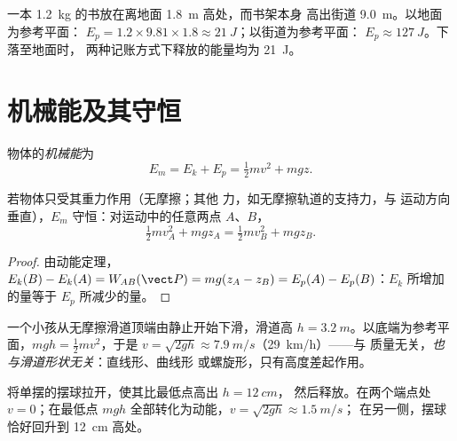 \begin{example}[书架上的书]\label{ex:g11:mechanical-energy:shelf}
一本 \qty{1.2}{kg} 的书放在离地面 \qty{1.8}{m} 高处，而书架本身
高出街道 \qty{9.0}{m}。以地面为参考平面：
$E_p = 1.2 \times 9.81 \times 1.8 \approx \qty{21}{J}$；以街道为参考平面：
$E_p \approx \qty{127}{J}$。下落至地面时，
两种记账方式下释放的能量均为 \qty{21}{J}。
\end{example}

\section{机械能及其守恒}

\begin{definition}[机械能]\label{def:g11:mechanical-energy:em}
物体的\emph{机械能}为
\[
E_m = E_k + E_p = \tfrac12 m v^2 + m g z .
\]
\end{definition}

\begin{theorem}[机械能守恒]\label{thm:g11:mechanical-energy:conservation}
若物体只受其重力作用（无摩擦；其他
力，如无摩擦轨道的支持力，与
运动方向垂直），$E_m$ 守恒：对运动中的任意两点 $A$、$B$，
\[
\tfrac12 m v_A^2 + m g z_A = \tfrac12 m v_B^2 + m g z_B .
\]
\end{theorem}

\begin{proof}
由动能定理，$E_k(B) - E_k(A) = W_{AB}(\vect P) =
mg(z_A - z_B) = E_p(A) - E_p(B)$：$E_k$ 所增加的量等于 $E_p$ 所减少的量。
\end{proof}

\begin{example}[水上滑道]\label{ex:g11:mechanical-energy:slide}
一个小孩从无摩擦滑道顶端由静止开始下滑，滑道高
$h = \qty{3.2}{m}$。以底端为参考平面，$mgh = \tfrac12 mv^2$，于是
$v = \sqrt{2gh} \approx \qty{7.9}{m/s}$（\qty{29}{km/h}）——与
质量无关，\emph{也与滑道形状无关}：直线形、曲线形
或螺旋形，只有高度差起作用。
\end{example}

\begin{example}[单摆]\label{ex:g11:mechanical-energy:pendulum}
将单摆的摆球拉开，使其比最低点高出 $h = \qty{12}{cm}$，
然后释放。在两个端点处 $v = 0$；在最低点
$mgh$ 全部转化为动能，$v = \sqrt{2gh} \approx \qty{1.5}{m/s}$；
在另一侧，摆球恰好回升到 \qty{12}{cm} 高处。
\end{example}


